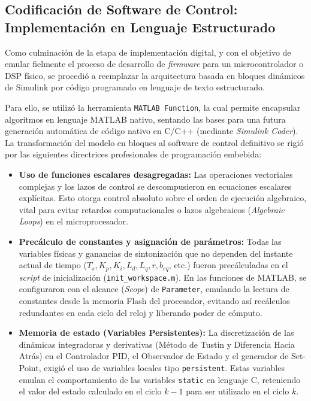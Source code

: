 \documentclass[10pt,a4paper]{article}
\begin{document}
\subsection{Codificación de Software de Control: Implementación en Lenguaje Estructurado}

Como culminación de la etapa de implementación digital, y con el objetivo de emular fielmente el proceso de desarrollo de \textit{firmware} para un microcontrolador o DSP físico, se procedió a reemplazar la arquitectura basada en bloques dinámicos de Simulink por código programado en lenguaje de texto estructurado.

Para ello, se utilizó la herramienta \texttt{MATLAB Function}, la cual permite encapsular algoritmos en lenguaje MATLAB nativo, sentando las bases para una futura generación automática de código nativo en C/C++ (mediante \textit{Simulink Coder}). La transformación del modelo en bloques al software de control definitivo se rigió por las siguientes directrices profesionales de programación embebida:

\begin{itemize}
    \item \textbf{Uso de funciones escalares desagregadas:} Las operaciones vectoriales complejas y los lazos de control se descompusieron en ecuaciones escalares explícitas. Esto otorga control absoluto sobre el orden de ejecución algebraico, vital para evitar retardos computacionales o lazos algebraicos (\textit{Algebraic Loops}) en el microprocesador.
    \item \textbf{Precálculo de constantes y asignación de parámetros:} Todas las variables físicas y ganancias de sintonización que no dependen del instante actual de tiempo ($T_s, K_p, K_i, L_d, L_q, r, b_{eq}$, etc.) fueron precálculadas en el \textit{script} de inicialización (\texttt{init\_workspace.m}). En las funciones de MATLAB, se configuraron con el alcance (\textit{Scope}) de \texttt{Parameter}, emulando la lectura de constantes desde la memoria Flash del procesador, evitando así recálculos redundantes en cada ciclo del reloj y liberando poder de cómputo.
    \item \textbf{Memoria de estado (Variables Persistentes):} La discretización de las dinámicas integradoras y derivativas (Método de Tustin y Diferencia Hacia Atrás) en el Controlador PID, el Observador de Estado y el generador de Set-Point, exigió el uso de variables locales tipo \texttt{persistent}. Estas variables emulan el comportamiento de las variables \texttt{static} en lenguaje C, reteniendo el valor del estado calculado en el ciclo $k-1$ para ser utilizado en el ciclo $k$.
\end{itemize}
\end{document}
